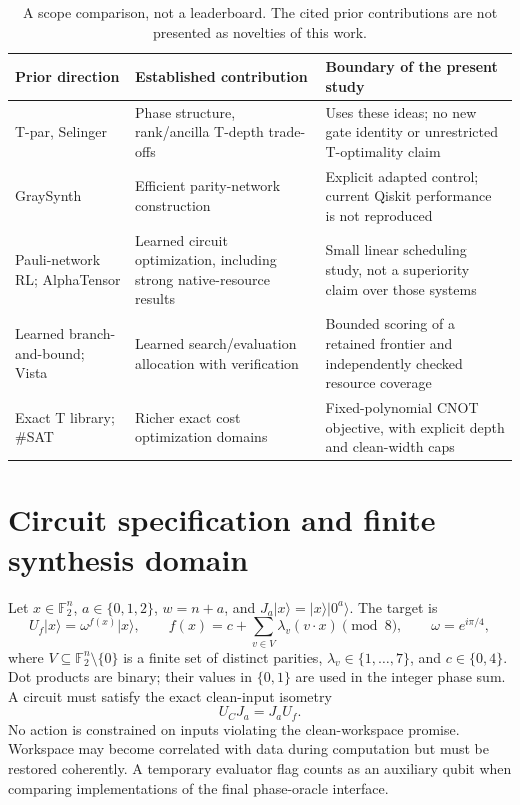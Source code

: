 \documentclass[11pt]{article}
\theoremstyle{definition}\newtheorem{definition}[theorem]{Definition}
\newcommand{\F}{\mathbb F_2}
\newcommand{\ket}[1]{\lvert #1\rangle}
\begin{document}
\begin{table}[t]
\centering\small
\begin{tabularx}{\linewidth}{@{}p{.23\linewidth}XX@{}}
\toprule
Prior direction & Established contribution & Boundary of the present study \\\midrule
T-par, Selinger & Phase structure, rank/ancilla T-depth trade-offs & Uses these ideas; no new gate identity or unrestricted T-optimality claim \\
GraySynth & Efficient parity-network construction & Explicit adapted control; current Qiskit performance is not reproduced \\
Pauli-network RL; AlphaTensor & Learned circuit optimization, including strong native-resource results & Small linear scheduling study, not a superiority claim over those systems \\
Learned branch-and-bound; Vista & Learned search/evaluation allocation with verification & Bounded scoring of a retained frontier and independently checked resource coverage \\
Exact T library; \#SAT & Richer exact cost optimization domains & Fixed-polynomial CNOT objective, with explicit depth and clean-width caps \\
\bottomrule
\end{tabularx}
\caption{A scope comparison, not a leaderboard. The cited prior contributions are not presented as novelties of this work.}
\end{table}

\section{Circuit specification and finite synthesis domain}
Let $x\in\F^n$, $a\in\{0,1,2\}$, $w=n+a$, and $J_a\ket{x}=\ket{x}\ket{0^a}$. The target is
\begin{equation}
U_f\ket{x}=\omega^{f(x)}\ket{x},\qquad
f(x)=c+\sum_{v\in V}\lambda_v(v\cdot x)\pmod 8,\qquad \omega=e^{i\pi/4},
\label{eq:target}
\end{equation}
where $V\subseteq\F^n\setminus\{0\}$ is a finite set of distinct parities, $\lambda_v\in\{1,\ldots,7\}$, and $c\in\{0,4\}$. Dot products are binary; their values in $\{0,1\}$ are used in the integer phase sum. A circuit must satisfy the exact clean-input isometry
\begin{equation}
U_CJ_a=J_aU_f.
\label{eq:contract}
\end{equation}
No action is constrained on inputs violating the clean-workspace promise. Workspace may become correlated with data during computation but must be restored coherently. A temporary evaluator flag counts as an auxiliary qubit when comparing implementations of the final phase-oracle interface.
\end{document}
